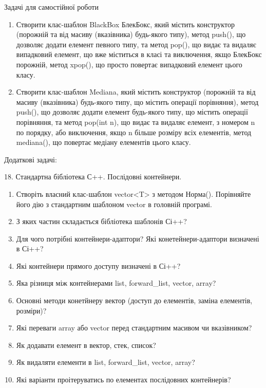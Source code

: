 \documentclass[]{article}
\makeatletter
\newcommand{\xslalph}[1]{\expandafter\@xslalph\csname c@#1\endcsname}
\newcommand{\@xslalph}[1]{%
    \ifcase#1\or а\or б\or в\or г\or д\or e\or є\or ж\or з\or i%
    \or й\or к\or л\or м\or н\or о\or п\or р\or с\or т%
    \or у\or ф\or х\or ц\or ч\or ш\or ю\or я\or аа\or бб\or вв%
    \else\@ctrerr\fi%
}
\makeatother
\begin{document}
\begin{enumerate}
\begin{enumerate}[label=\xslalph*)]
\begin{enumerate}
\begin{enumerate}[label=\xslalph*)]
\begin{enumerate}
\begin{enumerate}[label=\xslalph*)]
\begin{enumerate}
\begin{enumerate}[label=\xslalph*)]
Задачі для самостійної роботи

\begin{enumerate}
\def\labelenumi{\arabic{enumi})}
\item
  Створити клас-шаблон BlackBox БлекБокс, який містить конструктор
  (порожній та від масиву (вказівника) будь-якого типу), метод push(),
  що дозволяє додати елемент певного типу, та метод pop(), що видає та
  видаляє випадковий елемент, що вже міститься в класі та виключення,
  якщо БлекБокс порожній, метод xpop(), що просто повертає випадковий
  елемент цього класу.
\item
  Створити клас-шаблон Mediana, який містить конструктор (порожній та
  від масиву (вказівника) будь-якого типу, що містить операції
  порівняння), метод push(), що дозволяє додати елемент будь-якого типу,
  що містить операції порівняння, та метод pop(int n), що видає та
  видаляє елемент, з номером n по порядку, або виключення, якщо n більше
  розміру всіх елементів, метод mediana(), що повертає медіану елементів
  цього класу.
\end{enumerate}

Додаткові задачі:

18. Стандартна бібліотека С++. Послідовні контейнери.

\begin{enumerate}
\def\labelenumi{\arabic{enumi})}
\item
  Створіть власний клас-шаблон vector\textless{}T\textgreater{} з
  методом Норма(). Порівняйте його дію з стандартним шаблоном vector в
  головній програмі.
\item
  З яких частин складається бібліотека шаблонів Сі++?
\item
  Для чого потрібні контейнери-адаптори? Які конетейнери-адаптори
  визначені в Сі++?
\item
  Які контейнери прямого доступу визначені в Сі++?
\item
  Яка різниця між контейнерами list, forward\_list, vector, array?
\item
  Основні методи конетйнеру вектор (доступ до елементів, заміна
  елементів, розміри)?
\item
  Які переваги array або vector перед стандартним масивом чи
  вказівником?
\item
  Як додавати елемент в вектор, стек, список?
\item
  Як видаляти елементи в list, forward\_list, vector, array?
\item
  Які варіанти проітеруватись по елементах послідовних контейнерів?
\end{enumerate}


\end{enumerate}
\end{enumerate}
\end{enumerate}
\end{enumerate}
\end{enumerate}
\end{enumerate}
\end{enumerate}
\end{enumerate}
\end{document}
